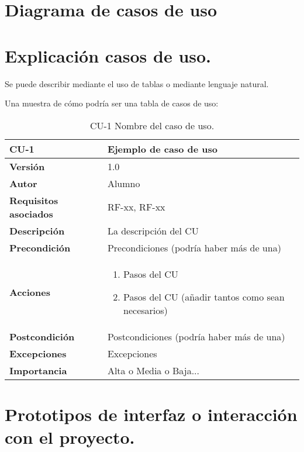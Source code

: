 \section{Diagrama de casos de uso}

\section{Explicación casos de uso.}

Se puede describir mediante el uso de tablas o mediante lenguaje natural.    

Una muestra de cómo podría ser una tabla de casos de uso:

\begin{table}[p]
	\centering
	\begin{tabularx}{\linewidth}{ p{} p{} }
		\toprule
		\textbf{CU-1}    & \textbf{Ejemplo de caso de uso}\\
		\toprule
		\textbf{Versión}              & 1.0    \\
		\textbf{Autor}                & Alumno \\
		\textbf{Requisitos asociados} & RF-xx, RF-xx \\
		\textbf{Descripción}          & La descripción del CU \\
		\textbf{Precondición}         & Precondiciones (podría haber más de una) \\
		\textbf{Acciones}             &
		\begin{enumerate}
			\def\labelenumi{\arabic{enumi}.}
			\tightlist
			\item Pasos del CU
			\item Pasos del CU (añadir tantos como sean necesarios)
		\end{enumerate}\\
		\textbf{Postcondición}        & Postcondiciones (podría haber más de una) \\
		\textbf{Excepciones}          & Excepciones \\
		\textbf{Importancia}          & Alta o Media o Baja... \\
		\bottomrule
	\end{tabularx}
	\caption{CU-1 Nombre del caso de uso.}
\end{table}

\section{Prototipos de interfaz o interacción con el proyecto.}


